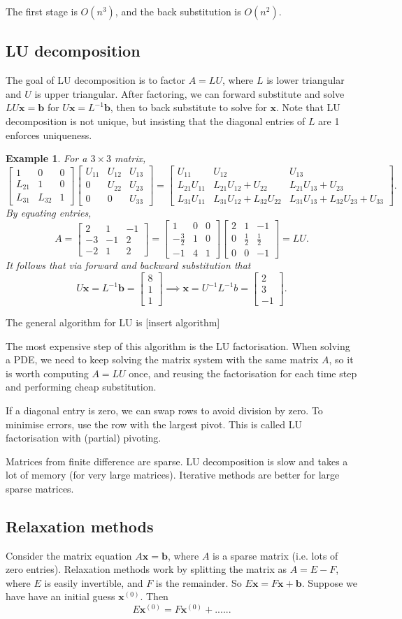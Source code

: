 \documentclass[11pt, a4paper]{article}
\newcommand{\inv}{^{-1}}
\theoremstyle{break}
\newtheorem{eg}[thm]{Example}
\def\matrixthreeHelp(#1,#2,#3,#4,#5,#6,#7,#8,#9){\begin{bmatrix}#1&#2&#3\\#4&#5&#6\\#7&#8&#9 \end{bmatrix}}%
\newcommand*{\matrixthree}[1]{\matrixthreeHelp(#1)}
\newcommand{\ve}{\mathbf} %
\begin{document}
The first stage is $O(n^3)$, and the back substitution is $O(n^2)$. 


\subsection{LU decomposition}
The goal of LU decomposition is to factor $A=LU$, where $L$ is lower triangular and $U$ is upper triangular. After factoring, we can forward substitute and solve $LU\ve x=\ve b$ for $U\ve x=L\inv \ve b$, then to back substitute to solve for $\ve x$. Note that LU decomposition is not unique, but insisting that the diagonal entries of $L$ are 1 enforces uniqueness.
\begin{eg} For a $3\times3$ matrix,
	\[\matrixthree{1,0,0,L_{21},1,0,L_{31},L_{32},1}\matrixthree{U_{11},U_{12},U_{13},0,U_{22},U_{23},0,0,U_{33}}=\matrixthree{U_{11},U_{12},U_{13},L_{21}U_{11},L_{21}U_{12}+U_{22},L_{21}U_{13}+U_{23},L_{31}U_{11},L_{31}U_{12}+L_{32}U_{22},L_{31}U_{13}+L_{32}U_{23}+U_{33}}.\] By equating entries, \[A=\matrixthree{2,1,-1,-3,-1,2,-2,1,2} = \matrixthree{1,0,0,-\frac32,1,0,-1,4,1}\matrixthree{2,1,-1,0,\frac12,\frac12,0,0,-1}=LU.\]
	It follows that via forward and backward substitution that \[U\ve x=L\inv \ve b=\begin{bmatrix} 8\\1\\1\end{bmatrix} \implies \ve x=U\inv L\inv b=\begin{bmatrix}2\\3\\-1\end{bmatrix}.\]
\end{eg}
The general algorithm for LU is [insert algorithm]

The most expensive step of this algorithm is the LU factorisation. When solving a PDE, we need to keep solving the matrix system with the same matrix $A$, so it is worth computing $A=LU$ once, and reusing the factorisation for each time step and performing cheap substitution.

If a diagonal entry is zero, we can swap rows to avoid division by zero. To minimise errors, use the row with the largest pivot. This is called LU factorisation with (partial) pivoting.

Matrices from finite difference are sparse. LU decomposition is slow and takes a lot of memory (for very large matrices). Iterative methods are better for large sparse matrices.


\subsection{Relaxation methods}
\newcommand{\xx}[1]{\ve x^{(#1)}}
Consider the matrix equation $A\ve x=\ve b$, where $A$ is a sparse matrix (i.e. lots of zero entries). Relaxation methods work by splitting the matrix as $A=E-F$, where $E$ is easily invertible, and $F$ is the remainder. So $E\ve x= F\ve x+\ve b$. Suppose we have have an initial guess $\xx0$. Then \[E\xx0 =F\xx0 + ......\]
\end{document}
